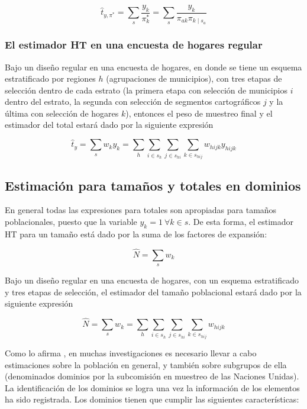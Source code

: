 \documentclass[
  10pt,
  spanish,
]{book}
\begin{document}
\[
\hat{t}_{y,\pi^*}=\sum_{s}\frac{y_k}{\pi_{k}^*}=\sum_{s}\frac{y_k}{\pi_{ak}\pi_{k\mid{s_a}}}
\]

\hypertarget{el-estimador-ht-en-una-encuesta-de-hogares-regular}{%
\subsubsection*{El estimador HT en una encuesta de hogares regular}\label{el-estimador-ht-en-una-encuesta-de-hogares-regular}}

Bajo un diseño regular en una encuesta de hogares, en donde se tiene un esquema estratificado por regiones \(h\) (agrupaciones de municipios), con tres etapas de selección dentro de cada estrato (la primera etapa con selección de municipios \(i\) dentro del estrato, la segunda con selección de segmentos cartográficos \(j\) y la última con selección de hogares \(k\)), entonces el peso de muestreo final y el estimador del total estará dado por la siguiente expresión

\[
\hat{t}_y = \sum_s w_k y_k = \sum_h \sum_{i \in s_h} \sum_{j \in s_{hi}} \sum_{k \in s_{hij}} w_{hijk} y_{hijk}
\]

\hypertarget{estimaciuxf3n-para-tamauxf1os-y-totales-en-dominios}{%
\subsection{Estimación para tamaños y totales en dominios}\label{estimaciuxf3n-para-tamauxf1os-y-totales-en-dominios}}

En general todas las expresiones para totales son apropiadas para tamaños poblacionales, puesto que la variable \(y_k = 1 \ \forall k \in s\). De esta forma, el estimador HT para un tamaño está dado por la suma de los factores de expansión:

\[
\hat{N} = \sum_s w_k 
\]

Bajo un diseño regular en una encuesta de hogares, con un esquema estratificado y tres etapas de selección, el estimador del tamaño poblacional estará dado por la siguiente expresión

\[
\hat{N} = \sum_s w_k = \sum_h \sum_{i \in s_h} \sum_{j \in s_{hi}} \sum_{k \in s_{hij}} w_{hijk} 
\]

Como lo afirma \citet{Gutierrez_2016}, en muchas investigaciones es necesario llevar a cabo estimaciones sobre la población en general, y también sobre subgrupos de ella (denominados dominios por la subcomisión en muestreo de las Naciones Unidas). La identificación de los dominios se logra una vez la información de los elementos ha sido registrada. Los dominios tienen que cumplir las siguientes características:
\end{document}
